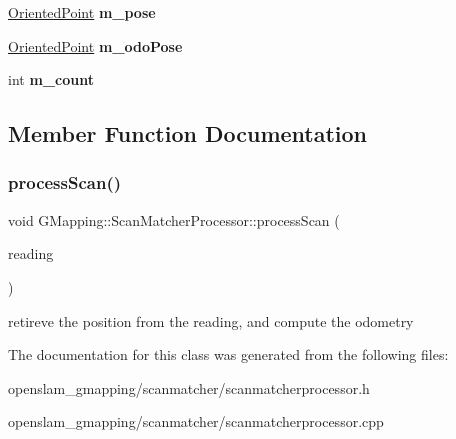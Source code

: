 \begin{DoxyCompactItemize}
\item 
\mbox{\label{classGMapping_1_1ScanMatcherProcessor_a5e4d87960d687ca221292107fcb44f5c}} 
\hyperlink{structGMapping_1_1orientedpoint}{Oriented\+Point} {\bfseries m\+\_\+pose}
\item 
\mbox{\label{classGMapping_1_1ScanMatcherProcessor_ade9308e24d692624a124ead635e24042}} 
\hyperlink{structGMapping_1_1orientedpoint}{Oriented\+Point} {\bfseries m\+\_\+odo\+Pose}
\item 
\mbox{\label{classGMapping_1_1ScanMatcherProcessor_a204d388a8822b459bcdc437ea3cd0e17}} 
int {\bfseries m\+\_\+count}
\end{DoxyCompactItemize}


\subsection{Member Function Documentation}
\mbox{\label{classGMapping_1_1ScanMatcherProcessor_a2b3362047c30befa6f48942a393be799}} 
\subsubsection{\texorpdfstring{process\+Scan()}{processScan()}}
{\footnotesize\ttfamily void G\+Mapping\+::\+Scan\+Matcher\+Processor\+::process\+Scan (\begin{DoxyParamCaption}\item[{const \hyperlink{classGMapping_1_1RangeReading}{Range\+Reading} \&}]{reading }\end{DoxyParamCaption})\hspace{0.3cm}{\ttfamily [virtual]}}

retireve the position from the reading, and compute the odometry 

The documentation for this class was generated from the following files\+:\begin{DoxyCompactItemize}
\item 
openslam\+\_\+gmapping/scanmatcher/scanmatcherprocessor.\+h\item 
openslam\+\_\+gmapping/scanmatcher/scanmatcherprocessor.\+cpp\end{DoxyCompactItemize}
